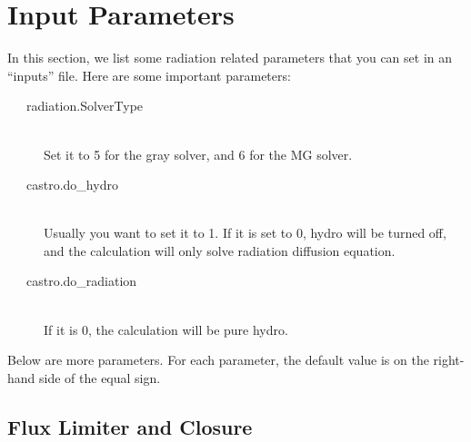 \documentclass[11pt,letterpaper]{article}
\begin{document}
\section{Input Parameters}

In this section, we list some radiation related parameters that you
can set in an ``inputs'' file.  Here are some important parameters:
\begin{description}
\item[\ \ \ radiation.SolverType] \hfill \\
  Set it to 5 for the gray solver, and 6 for the MG solver.
\item[\ \ \ castro.do\_hydro] \hfill \\
  Usually you want to set it to 1.  If it is set to 0, hydro will be
  turned off, and the calculation will only solve radiation diffusion
  equation.
\item[\ \ \ castro.do\_radiation] \hfill \\
  If it is 0, the calculation will be pure hydro.
\end{description}

Below are more parameters.  For each parameter, the default value is
on the right-hand side of the equal sign. 

\subsection{Flux Limiter and Closure}
\end{document}
